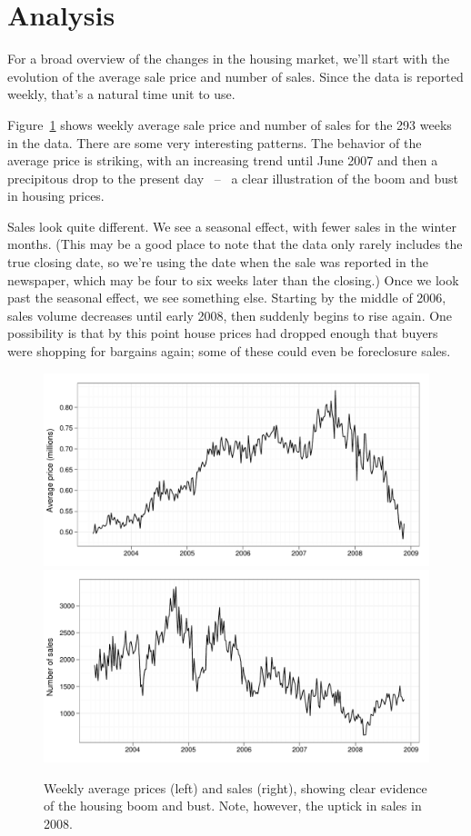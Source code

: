 \documentclass[oneside]{article}
\begin{document}
\section{Analysis}


For a broad overview of the changes in the housing market, we'll start with the evolution of the average sale price and number of sales.  Since the data is reported weekly, that's a natural time unit to use.


Figure~\ref{fig:daily} shows weekly average sale price and number of sales for the 293 weeks in the data.  There are some very interesting patterns.  The behavior of the average price is striking, with an increasing trend until June 2007 and then a precipitous drop to the present day ~--~ a clear illustration of the boom and bust in housing prices.  

Sales look quite different.  We see a seasonal effect, with fewer sales in the winter months. (This may be a good place to note that the data only rarely includes the true closing date, so we're using the date when the sale was reported in the newspaper, which may be four to six weeks later than the closing.)  Once we look past the seasonal effect, we see something else. Starting by the middle of 2006, sales volume decreases until early 2008, then suddenly begins to rise again. One possibility is that by this point house prices had dropped enough that buyers were shopping for bargains again; some of these could even be foreclosure sales.

\begin{figure}[htbp]
  \centering
    \includegraphics[width=0.5 \linewidth]{daily-price}%
    \includegraphics[width=0.5 \linewidth]{daily-sales}%
  \caption{Weekly average prices (left) and sales (right), showing clear evidence of the housing boom and bust.  Note, however, the uptick in sales in 2008.}
  \label{fig:daily}
\end{figure}
\end{document}
